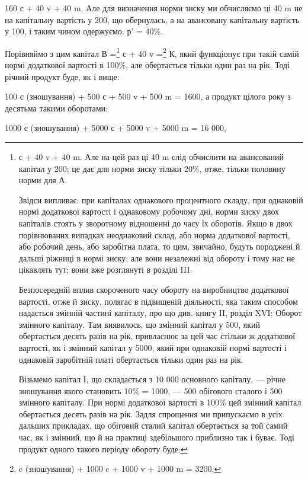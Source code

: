 160 с + 40 v + 40 m. Але для визначення норми зиску ми обчисляємо
ці 40 m не на капітальну вартість у 200, що обернулась,
а на авансовану капітальну вартість у 100, і таким чином
одержуємо: р' = 40\%.

Порівняймо з цим капітал В =\footnote{
с + 40 v + 40 m. Але на цей раз ці 40 m слід обчислити на
авансований капітал у 200; це дає для норми зиску тільки 20\%,
отже, тільки половину норми для А.

Звідси випливає: при капіталах однакового процентного
складу, при однаковій нормі додаткової вартості і однаковому
робочому дні, норми зиску двох капіталів стоять у зворотному
відношенні до часу їх оборотів. Якщо в двох порівнюваних випадках
неоднаковий склад, або норма додаткової вартості, або
робочий день, або заробітна плата, то цим, звичайно, будуть
породжені й дальші ріжниці в нормі зиску; але вони незалежні
від обороту і тому нас не цікавлять тут; вони вже розглянуті
в розділі III.

Безпосередній вплив скороченого часу обороту на виробництво
додаткової вартості, отже й зиску, полягає в підвищеній
діяльності, яка таким способом надається змінній частині капіталу,
про що див. книгу II, розділ XVI: Оборот змінного
капіталу. Там виявилось, що змінний капітал у 500, який обертається
десять разів на рік, привласнює за цей час стільки ж додаткової
вартості, як і змінний капітал у 5000, який при однаковій
нормі вартості і однаковій заробітній платі обертається
тільки один раз на рік.

Візьмемо капітал І, що складається з 10 000 основного капіталу,
— річне зношування якого становить 10\% = 1000, — 500
обігового сталого і 500 змінного капіталу. При нормі додаткової
вартості в 100\% цей змінний капітал обертається десять
разів на рік. Задля спрощення ми припускаємо в усіх дальших
прикладах, що обіговий сталий капітал обертається за той
самий час, як і змінний, що й на практиці здебільшого приблизно
так і буває. Тоді продукт одного такого періоду обороту буде:
} с + 40 v =\footnote{
c (зношування) + 1000 c + 1000 v + 1000 m = 3200,
} К, який
функціонує при такій самій нормі додаткової вартості в 100\%,
але обертається тільки один раз на рік. Тоді річний продукт
буде, як і вище:

100 с (зношування) + 500 с + 500 v + 500 m = 1600,
а продукт цілого року з десятьма такими оборотами:

1000 с (зношування) + 5000 с + 5000 v + 5000 m = 16 000,

